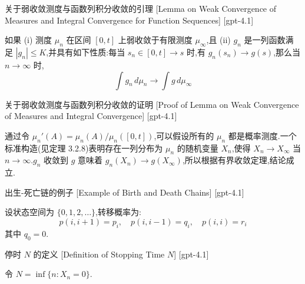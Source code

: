 \documentclass[UTF8]{ctexart}
\begin{document}
    
    
    \begin{lma}
        {关于弱收敛测度与函数列积分收敛的引理}
        [Lemma on Weak Convergence of Measures and Integral Convergence for Function Sequences]
        [gpt-4.1]
        
如果 (i) 测度 $\mu_{n}$ 在区间 $[0, t]$ 上弱收敛于有限测度 $\mu_{\infty}$,且 (ii) $g_{n}$ 是一列函数满足 $|g_{n}| \le K$,并具有如下性质:每当 $s_{n} \in [0, t] \to s$ 时,有 $g_{n}(s_{n}) \to g(s)$,那么当 $n \to \infty$ 时,
\[
\int g_{n}\, d\mu_{n} \to \int g\, d\mu_{\infty}
\]

    \end{lma}
    
    
    
    \begin{prf}
        {关于弱收敛测度与函数列积分收敛的证明}
        [Proof of Lemma on Weak Convergence of Measures and Integral Convergence]
        [gpt-4.1]
        
通过令 $\mu_{n}'(A) = \mu_{n}(A) / \mu_{n}([0, t])$,可以假设所有的 $\mu_{n}$ 都是概率测度.一个标准构造(见定理 3.2.8)表明存在一列分布为 $\mu_{n}$ 的随机变量 $X_{n}$,使得 $X_{n} \to X_{\infty}$ 当 $n \to \infty$.$g_{n}$ 收敛到 $g$ 意味着 $g_{n}(X_{n}) \to g(X_{\infty})$,所以根据有界收敛定理,结论成立.

    \end{prf}
    
    
    
    \begin{xmp}
        {出生-死亡链的例子}
        [Example of Birth and Death Chains]
        [gpt-4.1]
        
设状态空间为 $\{0, 1, 2, \ldots\}$,转移概率为:
\[
p(i, i+1) = p_i,\quad p(i, i-1) = q_i,\quad p(i, i) = r_i
\]
其中 $q_0 = 0$.

    \end{xmp}
    
    
    
    \begin{dfn}
        {停时 $N$ 的定义}
        [Definition of Stopping Time $N$]
        [gpt-4.1]
        
令 $N = \inf\{ n : X_n = 0 \}$.

    \end{dfn}
    
\end{document}
